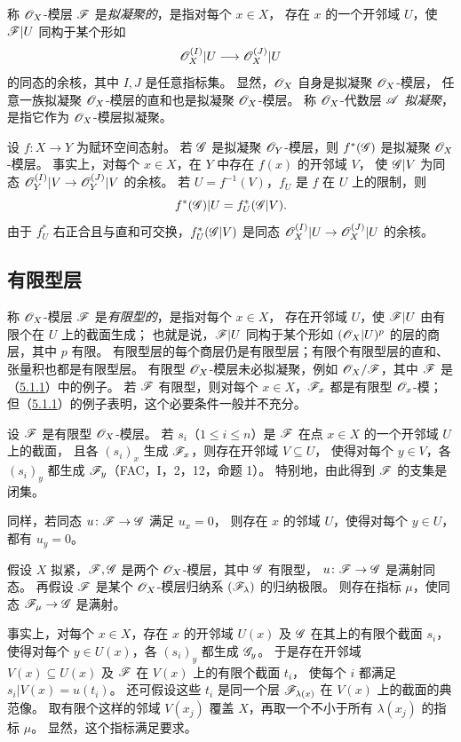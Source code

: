 称 $\mathscr O_X$-模层 $\mathscr F$ 是\emph{拟凝聚的}，是指对每个 $x\in X$，
存在 $x$ 的一个开邻域 $U$，使 $\mathscr F|U$ 同构于某个形如
\[
 \mathscr O_X^{(I)}|U\longrightarrow\mathscr O_X^{(J)}|U
\]
的同态的余核，其中 $I,J$ 是任意指标集。
显然，$\mathscr O_X$ 自身是拟凝聚 $\mathscr O_X$-模层，
任意一族拟凝聚 $\mathscr O_X$-模层的直和也是拟凝聚 $\mathscr O_X$-模层。
称 $\mathscr O_X$-代数层 $\mathscr A$ \emph{拟凝聚}，是指它作为 $\mathscr O_X$-模层拟凝聚。

设 $f\colon X\to Y$ 为赋环空间态射。
若 $\mathscr G$ 是拟凝聚 $\mathscr O_Y$-模层，则 $f^*(\mathscr G)$ 是拟凝聚 $\mathscr O_X$-模层。
事实上，对每个 $x\in X$，在 $Y$ 中存在 $f(x)$ 的开邻域 $V$，
使 $\mathscr G|V$ 为同态 $\mathscr O_Y^{(I)}|V\to\mathscr O_Y^{(J)}|V$ 的余核。
若 $U=f^{-1}(V)$，$f_U$ 是 $f$ 在 $U$ 上的限制，则
\[
 f^*(\mathscr G)|U=f_U^*(\mathscr G|V).
\]
由于 $f_U^*$ 右正合且与直和可交换，$f_U^*(\mathscr G|V)$ 是同态
$\mathscr O_X^{(I)}|U\to\mathscr O_X^{(J)}|U$ 的余核。

\subsection{有限型层}\hypertarget{heading:0:5.2}{}

称 $\mathscr O_X$-模层 $\mathscr F$ 是\emph{有限型的}，是指对每个 $x\in X$，
存在开邻域 $U$，使 $\mathscr F|U$ 由有限个在 $U$ 上的截面生成；
也就是说，$\mathscr F|U$ 同构于某个形如 $(\mathscr O_X|U)^p$ 的层的商层，其中 $p$ 有限。
有限型层的每个商层仍是有限型层；有限个有限型层的直和、张量积也都是有限型层。
有限型 $\mathscr O_X$-模层未必拟凝聚，例如 $\mathscr O_X/\mathscr F$，其中 $\mathscr F$ 是（\hyperlink{para:0:5.1.1}{5.1.1}）中的例子。
若 $\mathscr F$ 有限型，则对每个 $x\in X$，$\mathscr F_x$ 都是有限型 $\mathscr O_x$-模；
但（\hyperlink{para:0:5.1.1}{5.1.1}）的例子表明，这个必要条件一般并不充分。

设 $\mathscr F$ 是有限型 $\mathscr O_X$-模层。
若 $s_i$（$1\leq i\leq n$）是 $\mathscr F$ 在点 $x\in X$ 的一个开邻域 $U$ 上的截面，
且各 $(s_i)_x$ 生成 $\mathscr F_x$，则存在开邻域 $V\subseteq U$，
使得对每个 $y\in V$，各 $(s_i)_y$ 都生成 $\mathscr F_y$（FAC，I，2，12，命题 1）。
特别地，由此得到 $\mathscr F$ 的支集是闭集。

同样，若同态 $u\colon\mathscr F\to\mathscr G$ 满足 $u_x=0$，
则存在 $x$ 的邻域 $U$，使得对每个 $y\in U$，都有 $u_y=0$。

假设 $X$ 拟紧，$\mathscr F,\mathscr G$ 是两个 $\mathscr O_X$-模层，其中 $\mathscr G$ 有限型，
$u\colon\mathscr F\to\mathscr G$ 是满射同态。
再假设 $\mathscr F$ 是某个 $\mathscr O_X$-模层归纳系 $(\mathscr F_\lambda)$ 的归纳极限。
则存在指标 $\mu$，使同态 $\mathscr F_\mu\to\mathscr G$ 是满射。

事实上，对每个 $x\in X$，存在 $x$ 的开邻域 $U(x)$ 及 $\mathscr G$ 在其上的有限个截面 $s_i$，
使得对每个 $y\in U(x)$，各 $(s_i)_y$ 都生成 $\mathscr G_y$。
于是存在开邻域 $V(x)\subseteq U(x)$ 及 $\mathscr F$ 在 $V(x)$ 上的有限个截面 $t_i$，
使每个 $i$ 都满足 $s_i|V(x)=u(t_i)$。
还可假设这些 $t_i$ 是同一个层 $\mathscr F_{\lambda(x)}$ 在 $V(x)$ 上的截面的典范像。
取有限个这样的邻域 $V(x_j)$ 覆盖 $X$，再取一个不小于所有 $\lambda(x_j)$ 的指标 $\mu$。
显然，这个指标满足要求。

